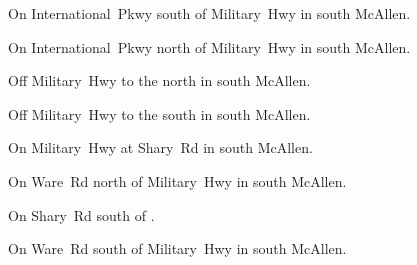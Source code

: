 
\begin{LocationList}

On International~Pkwy south of  Military~Hwy in south McAllen.

On International~Pkwy north of  Military~Hwy in south McAllen.

Off  Military~Hwy to the north in south McAllen.

\Location{\GarageHQ \Garage}
Off  Military~Hwy to the south in south McAllen.

\Location{\GasStation \Gas}
On  Military~Hwy at  Shary~Rd in south McAllen.

On Ware~Rd north of  Military~Hwy in south McAllen.

On  Shary~Rd south of .

On Ware~Rd south of  Military~Hwy in south McAllen.

\end{LocationList}
